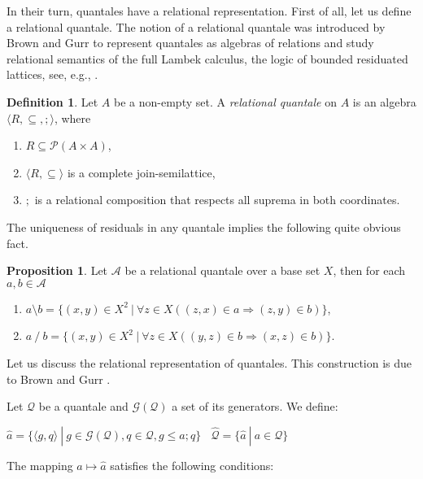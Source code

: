 \documentclass[a4paper]{article}
\theoremstyle{definition}
\newtheorem{definition}{Definition}
\theoremstyle{theorem}
\theoremstyle{proposition}
\newtheorem{proposition}{Proposition}
\theoremstyle{lemma}
\theoremstyle{ex}
\theoremstyle{corollary}
\theoremstyle{claim}
\begin{document}
In their turn, quantales have a relational representation. First of all, let us define a relational quantale.
The notion of a relational quantale was introduced by Brown and Gurr to represent quantales as algebras of relations and study relational semantics of the full Lambek calculus, the logic of bounded residuated lattices, see, e.g., \cite{brown1993representation}.
\begin{definition}
  Let $A$ be a non-empty set. A \emph{relational quantale} on $A$ is an algebra $\langle R, \subseteq, ; \rangle$, where
  \begin{enumerate}
    \item $R \subseteq \mathcal{P}(A \times A)$,
    \item $\langle R, \subseteq \rangle$ is a complete join-semilattice,
    \item $;$ is a relational composition that respects all suprema in both coordinates.
  \end{enumerate}
\end{definition}

The uniqueness of residuals in any quantale implies the following quite obvious fact.
\begin{proposition}\label{ok}
  Let $\mathcal{A}$ be a relational quantale over a base set $X$, then for each $a, b \in \mathcal{A}$
  \begin{enumerate}
    \item $a \setminus b = \{ (x, y) \in X^2 \: | \: \forall z \in X ( (z, x) \in a \Rightarrow (z, y) \in b) \}$,
    \item $a \: / \: b = \{ (x, y) \in X^2 \: | \: \forall z \in X ( (y, z) \in b \Rightarrow (x, z) \in b )\}$.
  \end{enumerate}
\end{proposition}

Let us discuss the relational representation of quantales. This construction is due to Brown and Gurr \cite{brown1993representation}.

Let $\mathcal{Q}$ be a quantale and $\mathcal{G}(\mathcal{Q})$ a set of its generators. We define:

\begin{center}
  $\hat{a} = \{ \langle g, q \rangle \: | \: g \in \mathcal{G}(\mathcal{Q}), q \in \mathcal{Q}, g \leq a ; q \} \:\:\:\: \widehat{\mathcal{Q}} = \{ \hat{a} \: | \: a \in \mathcal{Q} \}$
\end{center}

The mapping $a \mapsto \hat{a}$ satisfies the following conditions:
\end{document}

